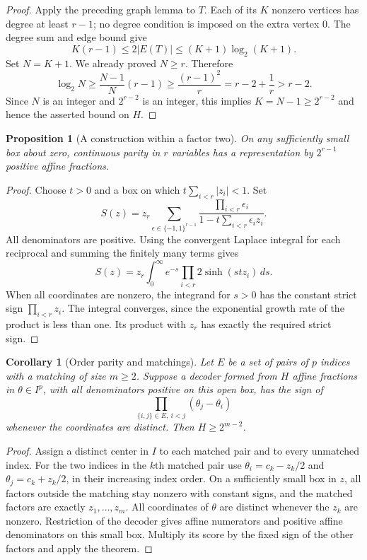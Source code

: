 \documentclass[11pt]{article}
\newtheorem{corollary}[theorem]{Corollary}
\newtheorem{proposition}[theorem]{Proposition}
\begin{document}
\begin{proof}
Apply the preceding graph lemma to $T$. Each of its $K$ nonzero vertices
has degree at least $r-1$; no degree condition is imposed on the extra
vertex $0$. The degree sum and edge bound give
\[
 K(r-1)\le2|E(T)|\le(K+1)\log_2(K+1).
\]
Set $N=K+1$. We already proved $N\ge r$. Therefore
\[
 \log_2N\ge\frac{N-1}{N}(r-1)
 \ge\frac{(r-1)^2}{r}=r-2+\frac1r>r-2.
\]
Since $N$ is an integer and $2^{r-2}$ is an integer, this implies
$K=N-1\ge2^{r-2}$ and hence the asserted bound on $H$.
\end{proof}

\begin{proposition}[A construction within a factor two]
On any sufficiently small box about zero, continuous parity in $r$
variables has a representation by $2^{r-1}$ positive affine fractions.
\end{proposition}
\begin{proof}
Choose $t>0$ and a box on which $t\sum_{i<r}|z_i|<1$. Set
\[
 S(z)=z_r\sum_{\epsilon\in\{-1,1\}^{r-1}}
       \frac{\prod_{i<r}\epsilon_i}
       {1-t\sum_{i<r}\epsilon_i z_i}.
\]
All denominators are positive. Using the convergent Laplace integral for
each reciprocal and summing the finitely many terms gives
\[
 S(z)=z_r\int_0^\infty e^{-s}
                \prod_{i<r}2\sinh(stz_i)\,ds.
\]
When all coordinates are nonzero, the integrand for $s>0$ has the
constant strict sign $\prod_{i<r}z_i$. The integral converges, since the
exponential growth rate of the product is less than one. Its product
with $z_r$ has exactly the required strict sign.
\end{proof}

\begin{corollary}[Order parity and matchings]
Let $E$ be a set of pairs of $p$ indices with a matching of size $m\ge2$.
Suppose a decoder formed from $H$ affine fractions in
$\theta\in I^p$, with all denominators positive on this open box, has
the sign of
\[
 \prod_{\{i,j\}\in E,\ i<j}(\theta_j-\theta_i)
\]
whenever the coordinates are distinct. Then $H\ge2^{m-2}$.
\end{corollary}
\begin{proof}
Assign a distinct center in $I$ to each matched pair and to every
unmatched index. For the two indices in the $k$th matched pair use
$\theta_i=c_k-z_k/2$ and $\theta_j=c_k+z_k/2$, in their increasing index
order. On a sufficiently small box in $z$, all factors outside the
matching stay nonzero with constant signs, and the matched factors are
exactly $z_1,\ldots,z_m$. All coordinates of $\theta$ are distinct
whenever the $z_k$ are nonzero. Restriction of the decoder gives affine
numerators and positive affine denominators on this small box. Multiply
its score by the fixed sign of the other factors and apply the theorem.
\end{proof}
\end{document}
